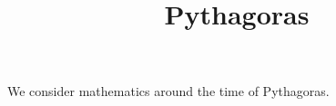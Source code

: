 \documentclass{ximera}
\title{Pythagoras}
\begin{document}
\begin{abstract}
\end{abstract}
\maketitle

We consider mathematics around the time of Pythagoras.
\end{document}
